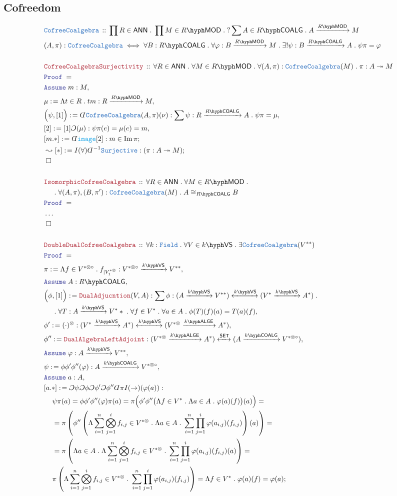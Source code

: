 \documentclass[12pt]{scrartcl}%
\newcommand{\TYPE}[1]{\textcolor{NavyBlue}{\mathtt{#1}}}%
\newcommand{\FUNC}[1]{\textcolor{Cerulean}{\mathtt{#1}}}%
\newcommand{\LOGIC}[1]{\textcolor{Blue}{\mathtt{#1}}}%
\newcommand{\THM}[1]{\textcolor{Maroon}{\mathtt{#1}}}%
\renewcommand{\.}{\; . \;} %
\newcommand{\de}{: \kern 0.1pc =} %
\newcommand{\Theorem}[2]{& \THM{#1} \, :: \, #2 \\ & \Proof = \\ } %
\newcommand{\DeclareType}[2]{& \TYPE{#1} \, :: \, #2 \\}%
\newcommand{\DefineType}[3]{& #1 : \TYPE{#2} \iff #3 \\}%
\newcommand{\NewLine}{\\ & \kern 1pc}%
\newcommand{\Page}[1]{ \begin{align*} #1 \end{align*}  }%
\newcommand{ \bd }{ \ByDef }%
\newcommand{\NoProof}{ & \ldots \\ \EndProof}%
\DeclareMathOperator*{\im}{Im}%
\newcommand{\ToSurj}{\twoheadrightarrow} %
\newcommand{\Say}[3]{& #1 \de #2 : #3, \\} %
\newcommand{\Conclude}[3]{& #1 \de #2 : #3; \\}%
\newcommand{\DeriveConclude}[3]{& \leadsto #1 \de #2 : #3 ; \\} %
\newcommand{\Assume}[2]{& \LOGIC{Assume} \; #1 : #2, \\} %
\newcommand{\QED}{\; \square} %
\newcommand{\EndProof}{& \QED \\} %
\newcommand{\ByDef}{\rotatebox[origin=c]{-180}{$D$}}%
\newcommand{\ByConstr}{\rotatebox[origin=c]{-180}{$C$}}%
\newcommand{\Proof}{\LOGIC{Proof} \; } %
\newcommand{\Arrow}[1]{\xrightarrow{#1}}%
\newcommand{\ToIso}[1]{\xleftrightarrow{#1}}%
\newcommand{\SET}{\mathsf{SET}} %
\newcommand{\VS}[1]{#1\hyph\mathsf{VS}} %
\newcommand{\LMOD}[1]{#1\hyph\mathsf{MOD}} %
\newcommand{\Field}{\TYPE{Field}}
\newcommand{\ANN}{\mathsf{ANN}} %
\newcommand{\LALGE}[1]{#1\hyph\mathsf{ALGE}}%
\newcommand{\COALG}[1]{#1\hyph\mathsf{COALG}}%
\begin{document}
\subsection{Cofreedom}
\Page{
	\DeclareType{CofreeCoalgebra}
	{
		\prod R \in \ANN \. 
		\prod M \in \LMOD{R} \.
		? \sum A \in \COALG{R} \. A  \Arrow{\LMOD{R}} M
	} 
	\DefineType{(A,\pi)}{CofreeCoalgebra}{\forall B : \COALG{R} \. \forall \varphi : B \Arrow{\LMOD{R}} M \. \exists! \psi : B \Arrow{\COALG{R}} A \. \psi \pi = \varphi } 
	\\
	\Theorem{CofreeCoalgebraSurjectivity}
	{
		\forall R \in \ANN \.
		\forall M \in \LMOD{R} \.
		\forall (A,\pi) : \TYPE{CofreeCoalgebra}(M) \.
		\pi : A \ToSurj M
	}
	\Assume{m}{M}
	\Say{\mu}{\Lambda t \in R \. tm }{R \Arrow{\LMOD{R}} M}
	\Say{\Big( \psi,[1]\Big)}{\bd \TYPE{CofreeCoalgebra}(A,\pi)(\nu)}{\sum \psi : R \Arrow{\COALG{R}} A \. \psi \pi = \mu }
	\Say{[2]}{[1]\ByConstr(\mu)}{ \psi \pi(e) = \mu(e) = m}
	\Conclude{[m.*]}{\bd \FUNC{image}[2]}{ m \in \im \pi  }
	\DeriveConclude{[*]}{I(\forall)\bd^{-1}\TYPE{Surjective}}{( \pi : A \ToSurj M )}
	\EndProof
	\\
	\Theorem{IsomorphicCofreeCoalgebra}
	{
		\forall R \in \ANN \.
		\forall M \in \LMOD{R} \.\NewLine \. 
		\forall (A,\pi),(B,\pi') : \TYPE{CofreeCoalgebra}(M) \.
		A \cong_{\COALG{R}} B
	}
	\NoProof
	\\
	\Theorem{DoubleDualCofreeCoalgebra}
	{
		\forall k : \Field \.
		\forall V \in \VS{k} \.
		\exists \TYPE{CofreeCoalgebra}(V^{**})
	}
	\Say{\pi}{\Lambda f \in V^{*\otimes\circ} \. f_{|V^{*\otimes}_1}}{V^{*\otimes\circ} \Arrow{\VS{k}} V^{**}} 
	\Assume{A}{\COALG{R}}
	\Say{\Big( \phi, [1] \Big)}{\THM{DualAdjucntion}(V,A)}{
		\sum \phi : (A \Arrow{\VS{k}} V^{**} ) \ToIso{\VS{k}} (V^* \Arrow{\VS{k}} A^{*} ) \. \NewLine \.
		\forall T : A \Arrow{\VS{k}}  V^** \.  
		\forall  f \in V^* \. 
		\forall a \in A \. 
		\phi(T)(f)(a)  =  T(a)(f)          
	}
	\Say{\phi'}{(\cdot)^\otimes}{ (V^* \Arrow{\VS{k}}  A^*) \ToIso{\VS{k}} (V^{*\otimes} \Arrow{\LALGE{k}} A^*) }
	\Say{\phi''}{\THM{DualAlgebraLeftAdjoint}}{ (V^{*\otimes} \Arrow{\LALGE{k}}  A^*) \ToIso{\SET}  (A \Arrow{\COALG{k}} V^{*\otimes\circ} )  }                       
	\Assume{\varphi}{A \Arrow{\VS{k}} V^{**}}
	\Say{\psi}{\phi\phi'\phi''(\varphi)}{A \Arrow{\COALG{k}} V^{*\otimes\circ}}
	\Assume{a}{A}
	\Conclude{[a.*]}{  \ByConstr \psi \ByConstr \phi \ByConstr \phi' \ByConstr \phi'' \bd \pi I(\to)(\varphi(a))  }
	{
		\NewLine
		\psi \pi(a) =  
		\phi\phi'\phi''(\varphi) \pi(a) =
		\pi\Big( \phi'\phi''\big(  \Lambda f \in V^* \. \Lambda a \in A \. \varphi(a)(f) \big)(a) \Big) = \NewLine = 
		\pi\left( \phi''\left(  \Lambda \sum^n_{i=1}  \bigotimes^{i}_{j=1} f_{i,j} \in V^{*\otimes} \. \Lambda a \in A \.  \sum^n_{i=1} \prod^i_{j=1} \varphi(a_{i,j})(f_{i,j}) \right)(a) \right) = \NewLine =
		\pi\left( \Lambda a \in A \. \Lambda \sum^n_{i=1} \bigotimes^{i}_{j=1} f_{i,j} \in V^{*\otimes} \. \sum^n_{i=1} \prod^i_{j=1} \varphi(a_{i,j})(f_{i,j}) (a) \right) = \NewLine 
		\pi\left( \Lambda \sum^n_{i=1} \bigotimes^{i}_{j=1} f_{i,j} \in V^{*\otimes} \. \sum^n_{i=1} \prod^i_{j=1} \varphi(a_{i,j})(f_{i,j})  \right) = 
		\Lambda  f \in V^* \. \varphi(a)(f) = 
		\varphi(a)
	}
}
\end{document}
